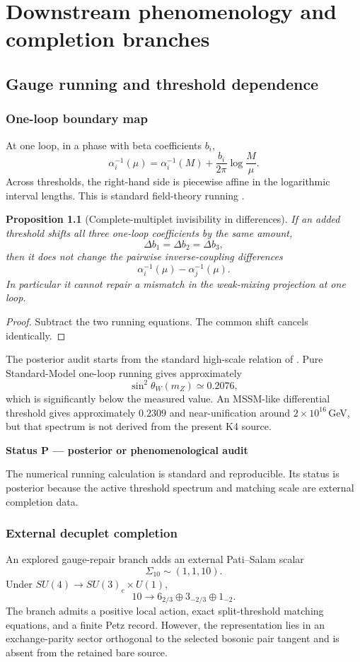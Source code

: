 \documentclass[11pt,oneside,openany]{book}
\numberwithin{equation}{chapter}
\newtheorem{proposition}[theorem]{Proposition}
\theoremstyle{definition}
\theoremstyle{remark}
\newenvironment{statusbox}[2]{%
  \par\medskip\noindent
  \begin{center}\begin{minipage}{0.94\textwidth}
  \colorbox{#1!8}{\parbox{\dimexpr\linewidth-2\fboxsep\relax}{\textbf{#2}}}\par\smallskip
}{%
  \end{minipage}\end{center}\medskip
}
\newcommand{\Posterior}[1]{\begin{statusbox}{PostColor}{Status P --- posterior or phenomenological audit}#1\end{statusbox}}
\begin{document}
\part{Downstream phenomenology and completion branches}

\chapter{Gauge running and threshold dependence}
\label{ch:gauge-running}

\section{One-loop boundary map}
At one loop, in a phase with beta coefficients $b_i$,
\[
 \alpha_i^{-1}(\mu)
 =\alpha_i^{-1}(M)
 +\frac{b_i}{2\pi}\log\frac{M}{\mu}.
\]
Across thresholds, the right-hand side is piecewise affine in the logarithmic interval lengths.  This is standard field-theory running \cite{MachacekVaughn1983,LuoWangXiao2003}.

\begin{proposition}[Complete-multiplet invisibility in differences]
\label{prop:complete-multiplet}
If an added threshold shifts all three one-loop coefficients by the same amount,
\[
 \Delta b_1=\Delta b_2=\Delta b_3,
\]
then it does not change the pairwise inverse-coupling differences
\[
 \alpha_i^{-1}(\mu)-\alpha_j^{-1}(\mu).
\]
In particular it cannot repair a mismatch in the weak-mixing projection at one loop.
\end{proposition}

\begin{proof}
Subtract the two running equations.  The common shift cancels identically.
\end{proof}

The posterior audit starts from the standard high-scale relation of .  Pure Standard-Model one-loop running gives approximately
\[
 \sin^2\theta_W(m_Z)\simeq0.2076,
\]
which is significantly below the measured value.  An MSSM-like differential threshold gives approximately $0.2309$ and near-unification around $2\times10^{16}\,$GeV, but that spectrum is not derived from the present K4 source.

\Posterior{The numerical running calculation is standard and reproducible.  Its status is posterior because the active threshold spectrum and matching scale are external completion data.}

\section{External decuplet completion}
An explored gauge-repair branch adds an external Pati--Salam scalar
\[
 \Sigma_{10}\sim(1,1,10).
\]
Under $SU(4)\to SU(3)_c\times U(1)$,
\[
 10\to6_{2/3}\oplus3_{-2/3}\oplus1_{-2}.
\]
The branch admits a positive local action, exact split-threshold matching equations, and a finite Petz record.  However, the representation lies in an exchange-parity sector orthogonal to the selected bosonic pair tangent and is absent from the retained bare source.
\end{document}
